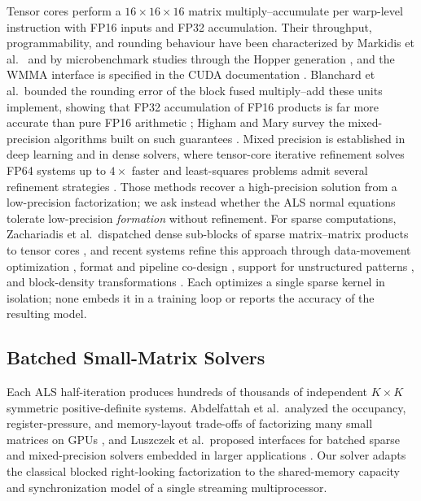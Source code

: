 Tensor cores perform a $16 \times 16 \times 16$ matrix multiply--accumulate per warp-level instruction with FP16 inputs and FP32 accumulation. Their throughput, programmability, and rounding behaviour have been characterized by Markidis et al.\ \cite{markidis2018nvidia} and by microbenchmark studies through the Hopper generation \cite{jia2018dissecting,luo2024hopper}, and the WMMA interface is specified in the CUDA documentation \cite{nvidia2023cuda}. Blanchard et al.\ bounded the rounding error of the block fused multiply--add these units implement, showing that FP32 accumulation of FP16 products is far more accurate than pure FP16 arithmetic \cite{blanchard2020mixed}; Higham and Mary survey the mixed-precision algorithms built on such guarantees \cite{higham2002accuracy,higham2022mixed}. Mixed precision is established in deep learning \cite{micikevicius2018mixed} and in dense solvers, where tensor-core iterative refinement solves FP64 systems up to $4\times$ faster \cite{haidar2018harnessing} and least-squares problems admit several refinement strategies \cite{carson2025comparison}. Those methods recover a high-precision solution from a low-precision factorization; we ask instead whether the ALS normal equations tolerate low-precision \textit{formation} without refinement. For sparse computations, Zachariadis et al.\ dispatched dense sub-blocks of sparse matrix--matrix products to tensor cores \cite{zachariadis2020accelerating}, and recent systems refine this approach through data-movement optimization \cite{fan2024dtcspmm}, format and pipeline co-design \cite{zhao2025accspmm}, support for unstructured patterns \cite{okanovic2024unstructured}, and block-density transformations \cite{dong2026blocksmith}. Each optimizes a single sparse kernel in isolation; none embeds it in a training loop or reports the accuracy of the resulting model.

\subsection{Batched Small-Matrix Solvers}

Each ALS half-iteration produces hundreds of thousands of independent $K \times K$ symmetric positive-definite systems. Abdelfattah et al.\ analyzed the occupancy, register-pressure, and memory-layout trade-offs of factorizing many small matrices on GPUs \cite{abdelfattah2017factorization}, and Luszczek et al.\ proposed interfaces for batched sparse and mixed-precision solvers embedded in larger applications \cite{luszczek2024batched}. Our solver adapts the classical blocked right-looking factorization \cite{golub2013matrix} to the shared-memory capacity and synchronization model of a single streaming multiprocessor.

